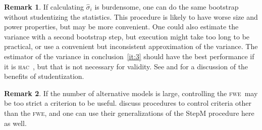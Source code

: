 \documentclass[11pt,fleqn]{article}
\theoremstyle{definition}
\newtheorem{rem}{Remark}
\newcommand{\fwe}{\textsc{fwe}}
\newcommand{\hac}{\textsc{hac}}
\begin{document}
\begin{rem}
  If calculating $\hat{\sigma}_i$ is burdensome, one can do the same
  bootstrap without studentizing the statistics.  This procedure is
  likely to have worse size and power properties, but may be more
  convenient.  One could also estimate the variance with a second
  bootstrap step, but execution might take too long to be practical,
  or use a convenient but inconsistent approximation of the variance.
  The estimator of the variance in conclusion~\ref{it:3} should have the
  best performance if it is \hac\ \cite[the results of][may be
  relevant]{GoK:96}, but that is not necessary for validity.
  See \citet{Han:05} and \citet[Section~4.2]{RoW:05} for a discussion
  of the benefits of studentization.
\end{rem}

\begin{rem}
  If the number of alternative models is large, controlling the \fwe\
  may be too strict a criterion to be useful.  \citet{RSW:08} discuss procedures to
  control criteria other than the \fwe, and one can use their
  generalizations of the StepM procedure here as well.
\end{rem}
\end{document}
